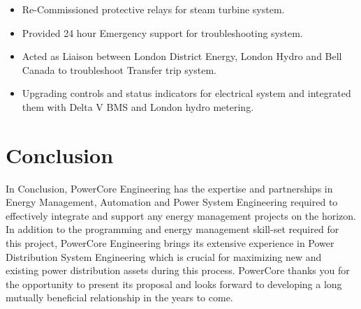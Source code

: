 \begin{itemize}
		\item Re-Commissioned protective relays for steam turbine system.
		\item Provided 24 hour Emergency support for troubleshooting system.
		\item Acted as Liaison between London District Energy, London Hydro and Bell Canada to troubleshoot Transfer trip system.
		\item Upgrading controls and status indicators for electrical system and integrated them with Delta V BMS and London hydro metering.
\end{itemize}

\pagebreak

\section{Conclusion}
\label{Conclusion}

In Conclusion, PowerCore Engineering has the expertise and partnerships in Energy Management, Automation and Power System Engineering required to effectively integrate and support any energy management projects on the horizon. In addition to the programming and energy management skill-set required for this project, PowerCore Engineering brings its extensive experience in Power Distribution System Engineering which is crucial for maximizing new and existing power distribution assets during this process.  PowerCore thanks you for the opportunity to present its proposal and looks forward to developing a long mutually beneficial relationship in the years to come.\\

\pagebreak